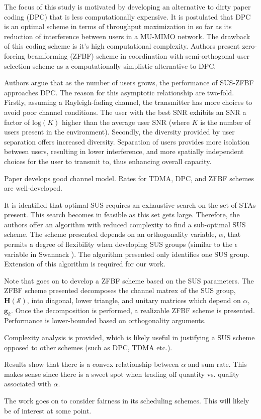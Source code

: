The focus of this study is motivated by developing an alternative to dirty paper coding (DPC) that is less computationally expensive. It is postulated that DPC is an optimal scheme in terms of throughput maximization in so far as its reduction of interference between users in a MU-MIMO network. The drawback of this coding scheme is it's high computational complexity. Authors present zero-forcing beamforming (ZFBF) scheme in coordination with semi-orthogonal user selection scheme as a computationally simplistic alternative to DPC.

Authors argue that as the number of users grows, the performance of SUS-ZFBF approaches DPC. The reason for this asymptotic relationship are two-fold. Firstly, assuming a Rayleigh-fading channel, the transmitter has more choices to avoid poor channel conditions. The user with the best SNR exhibits an SNR a factor of $\text{log}(K)$ higher than the average user SNR (where $K$ is the number of users present in the environment). Secondly, the diversity provided by user separation offers increased diversity. Separation of users provides more isolation between users, resulting in lower interference, and more spatially independent choices for the user to transmit to, thus enhancing overall capacity.

Paper develops good channel model. Rates for TDMA, DPC, and ZFBF schemes are well-developed.

It is identified that optimal SUS requires an exhaustive search on the set of STAs present. This search becomes in feasible as this set gets large. Therefore, the authors offer an algorithm with reduced complexity to find a sub-optimal SUS scheme. The scheme presented depends on an orthogonality variable, $\alpha$, that permits a degree of flexibility when developing SUS groups (similar to the $\epsilon$ variable in Swannack \cite{1549555}). The algorithm presented only identifies one SUS group. Extension of this algorithm is required for our work. 

Note that \cite{1603708} goes on to develop a ZFBF scheme based on the SUS parameters. The ZFBF scheme presented decomposes the channel matrex of the SUS group, $\textbf{H}(\mathcal{S})$, into diagonal, lower triangle, and unitary matrices which depend on $\alpha$, $\textbf{g}_k$. Once the decomposition is performed, a realizable ZFBF scheme is presented. Performance is lower-bounded based on orthogonality arguments.

Complexity analysis is provided, which is likely useful in justifying a SUS scheme opposed to other schemes (such as DPC, TDMA etc.).

Results show that there is a convex relationship between $\alpha$ and sum rate. This makes sense since there is a sweet spot when trading off quantity vs. quality associated with $\alpha$.

The work goes on to consider fairness in its scheduling schemes. This will likely be of interest at some point.
